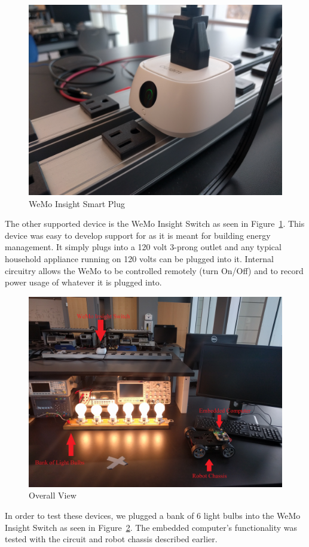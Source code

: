 \begin{figure}[H]
    \centering
    \includegraphics[scale=0.07]{figs/wemo/wemoView.jpg}
    \caption{WeMo Insight Smart Plug}
    \label{fig:wemo}
\end{figure}

The other supported device is the WeMo Insight Switch as seen in Figure~\ref{fig:wemo}. This device was easy to develop support for as it is meant for building energy management. It simply plugs into a 120 volt 3-prong outlet and any typical household appliance running on 120 volts can be plugged into it. Internal circuitry allows the WeMo to be controlled remotely (turn On/Off) and to record power usage of whatever it is plugged into.

\begin{figure}[H]
    \centering
    \includegraphics[scale=0.07]{figs/overallView.jpg}
    \caption{Overall View}
    \label{fig:overallView}
\end{figure}

In order to test these devices, we plugged a bank of 6 light bulbs into the WeMo
Insight Switch as seen in Figure~\ref{fig:overallView}. The embedded computer's
functionality was tested with the circuit and robot chassis described earlier.

